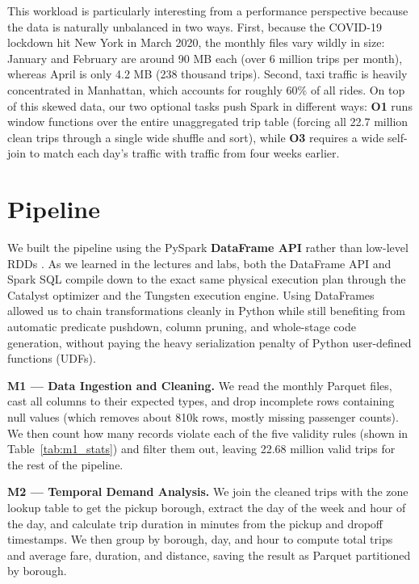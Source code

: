 \documentclass[sigconf,nonacm]{acmart}
\begin{document}
This workload is particularly interesting from a performance perspective because the data is naturally unbalanced in two ways. First, because the COVID-19 lockdown hit New York in March 2020, the monthly files vary wildly in size: January and February are around 90 MB each (over 6 million trips per month), whereas April is only 4.2 MB (238 thousand trips). Second, taxi traffic is heavily concentrated in Manhattan, which accounts for roughly 60\% of all rides. On top of this skewed data, our two optional tasks push Spark in different ways: \textbf{O1} runs window functions over the entire unaggregated trip table (forcing all 22.7 million clean trips through a single wide shuffle and sort), while \textbf{O3} requires a wide self-join to match each day's traffic with traffic from four weeks earlier.

\section{Pipeline}

We built the pipeline using the PySpark \textbf{DataFrame API} rather than low-level RDDs \cite{pysparkapi2026, sparktuning2026}. As we learned in the lectures and labs, both the DataFrame API and Spark SQL compile down to the exact same physical execution plan through the Catalyst optimizer and the Tungsten execution engine. Using DataFrames allowed us to chain transformations cleanly in Python while still benefiting from automatic predicate pushdown, column pruning, and whole-stage code generation, without paying the heavy serialization penalty of Python user-defined functions (UDFs).

\textbf{M1 --- Data Ingestion and Cleaning.} We read the monthly Parquet files, cast all columns to their expected types, and drop incomplete rows containing null values (which removes about 810k rows, mostly missing passenger counts). We then count how many records violate each of the five validity rules (shown in Table~\ref{tab:m1_stats}) and filter them out, leaving 22.68 million valid trips for the rest of the pipeline.

\textbf{M2 --- Temporal Demand Analysis.} We join the cleaned trips with the zone lookup table to get the pickup borough, extract the day of the week and hour of the day, and calculate trip duration in minutes from the pickup and dropoff timestamps. We then group by borough, day, and hour to compute total trips and average fare, duration, and distance, saving the result as Parquet partitioned by borough.
\end{document}
